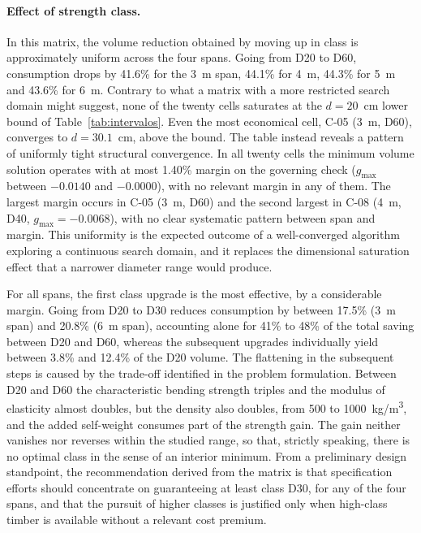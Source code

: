 \paragraph{Effect of strength class.} In this matrix, the volume reduction obtained by moving up in class is approximately uniform across the four spans. Going from D20 to D60, consumption drops by 41.6\% for the 3~m span, 44.1\% for 4~m, 44.3\% for 5~m and 43.6\% for 6~m.
Contrary to what a matrix with a more restricted search domain might suggest, none of the twenty cells saturates at the $d = 20$~cm lower bound of Table~\ref{tab:intervalos}. Even the most economical cell, C-05 (3~m, D60), converges to $d = 30.1$~cm, above the bound.
The table instead reveals a pattern of uniformly tight structural convergence. In all twenty cells the minimum volume solution operates with at most 1.40\% margin on the governing check ($g_{\max}$ between $-0.0140$ and $-0.0000$), with no relevant margin in any of them. The largest margin occurs in C-05 (3~m, D60) and the second largest in C-08 (4~m, D40, $g_{\max} = -0.0068$), with no clear systematic pattern between span and margin.
This uniformity is the expected outcome of a well-converged algorithm exploring a continuous search domain, and it replaces the dimensional saturation effect that a narrower diameter range would produce.

For all spans, the first class upgrade is the most effective, by a considerable margin.
Going from D20 to D30 reduces consumption by between 17.5\% (3~m span) and 20.8\% (6~m span), accounting alone for 41\% to 48\% of the total saving between D20 and D60, whereas the subsequent upgrades individually yield between 3.8\% and 12.4\% of the D20 volume.
The flattening in the subsequent steps is caused by the trade-off identified in the problem formulation. Between D20 and D60 the characteristic bending strength triples and the modulus of elasticity almost doubles, but the density also doubles, from 500 to 1000~kg/m\textsuperscript{3}, and the added self-weight consumes part of the strength gain.
The gain neither vanishes nor reverses within the studied range, so that, strictly speaking, there is no optimal class in the sense of an interior minimum.
From a preliminary design standpoint, the recommendation derived from the matrix is that specification efforts should concentrate on guaranteeing at least class D30, for any of the four spans, and that the pursuit of higher classes is justified only when high-class timber is available without a relevant cost premium.


